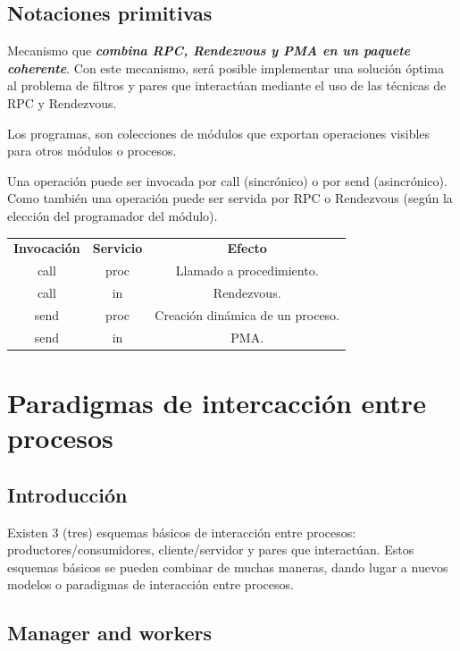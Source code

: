 \documentclass[a4paper, 10pt]{report}
\begin{document}
\section{Notaciones primitivas}

Mecanismo que \textbf{\emph{combina RPC, Rendezvous y PMA en un paquete coherente}}. Con este mecanismo, será posible implementar una solución óptima al problema de filtros y pares que interactúan mediante el uso de las técnicas de RPC y Rendezvous.

Los programas, son colecciones de módulos que exportan operaciones visibles para otros módulos o procesos.

Una operación puede ser invocada por call (sincrónico) o por send (asincrónico). Como también una operación puede ser servida por RPC o Rendezvous (según la elección del programador del módulo).

{\renewcommand{\arraystretch}{2}%
\begin{center}
    \begin{tabular}{c c c}
    \textbf{Invocación} &  \textbf{Servicio} & \textbf{Efecto} \\
    call & proc & Llamado a procedimiento. \\
    \hline
    call & in & Rendezvous. \\
    \hline
    send & proc & Creación dinámica de un proceso. \\
    \hline
    send & in & PMA. \\
\end{tabular}
\end{center}}

\chapter{Paradigmas de intercacción entre procesos}

\section{Introducción}

Existen 3 (tres) esquemas básicos de interacción entre procesos: productores/consumidores, cliente/servidor y pares que interactúan. Estos esquemas básicos se pueden combinar de muchas maneras, dando lugar a nuevos modelos o paradigmas de interacción entre procesos.

\section{Manager and workers}
\end{document}
